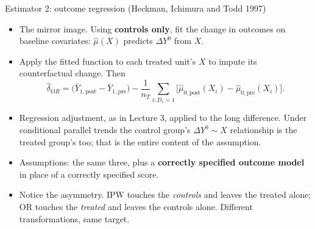 \documentclass[
  11pt,
  ignorenonframetext,
  aspectratio=169,
]{beamer}
\providecommand{\tightlist}{%
  \setlength{\itemsep}{0pt}\setlength{\parskip}{0pt}}
\begin{document}
\begin{frame}{Estimator 2: outcome regression (Heckman, Ichimura and
Todd 1997)}
\protect{}\label{estimator-2-outcome-regression-heckman-ichimura-and-todd-1997}
\begin{itemize}
\tightlist
\item
  The mirror image. Using \textbf{controls only}, fit the change in
  outcomes on baseline covariates: \(\hat\mu(X)\) predicts
  \(\Delta Y^0\) from \(X\).
\item
  Apply the fitted function to each treated unit's \(X\) to impute its
  counterfactual change. Then \[
  \hat\delta_{OR} = \big(\bar Y_{1,\text{post}} - \bar Y_{1,\text{pre}}\big) - \frac{1}{n_T}\sum_{i: D_i = 1}\big[\hat\mu_{0,\text{post}}(X_i) - \hat\mu_{0,\text{pre}}(X_i)\big].
  \]
\item
  Regression adjustment, as in Lecture 3, applied to the long
  difference. Under conditional parallel trends the control group's
  \(\Delta Y^0 \sim X\) relationship is the treated group's too; that is
  the entire content of the assumption.
\item
  Assumptions: the same three, plus a \textbf{correctly specified
  outcome model} in place of a correctly specified score.
\item
  Notice the asymmetry. IPW touches the \emph{controls} and leaves the
  treated alone; OR touches the \emph{treated} and leaves the controls
  alone. Different transformations, same target.
\end{itemize}
\end{frame}
\end{document}
